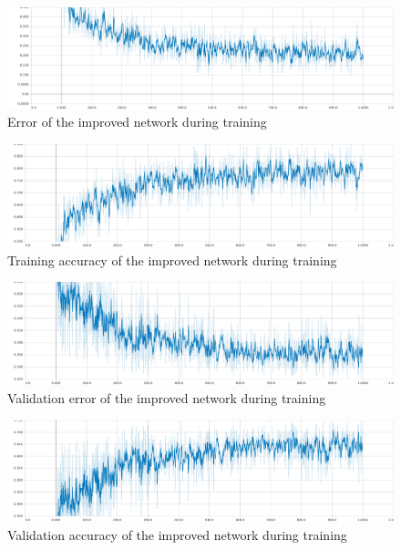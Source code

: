 \documentclass[
        a4paper,
        10pt,
        parskip = full,    %
    ]{scrartcl}
\begin{document}
\begin{figure}[H]
  \begin{center}
    \includegraphics[width=16cm]{../images/improved_train_error.pdf}
    \caption{Error of the improved network during training}
    \label{Learning measurements}
  \end{center}
\end{figure}

\begin{figure}[H]
  \begin{center}
    \includegraphics[width=16cm]{../images/improved_train_accuracy.pdf}
    \caption{Training accuracy of the improved network during training}
    \label{Learning measurements}
  \end{center}
\end{figure}

\begin{figure}[H]
  \begin{center}
    \includegraphics[width=16cm]{../images/improved_valid_error.pdf}
    \caption{Validation error of the improved network during training}
    \label{Learning measurements}
  \end{center}
\end{figure}

\begin{figure}[H]
  \begin{center}
    \includegraphics[width=16cm]{../images/improved_valid_accuracy.pdf}
    \caption{Validation accuracy of the improved network during training}
    \label{Learning measurements}
  \end{center}
\end{figure}
\end{document}
